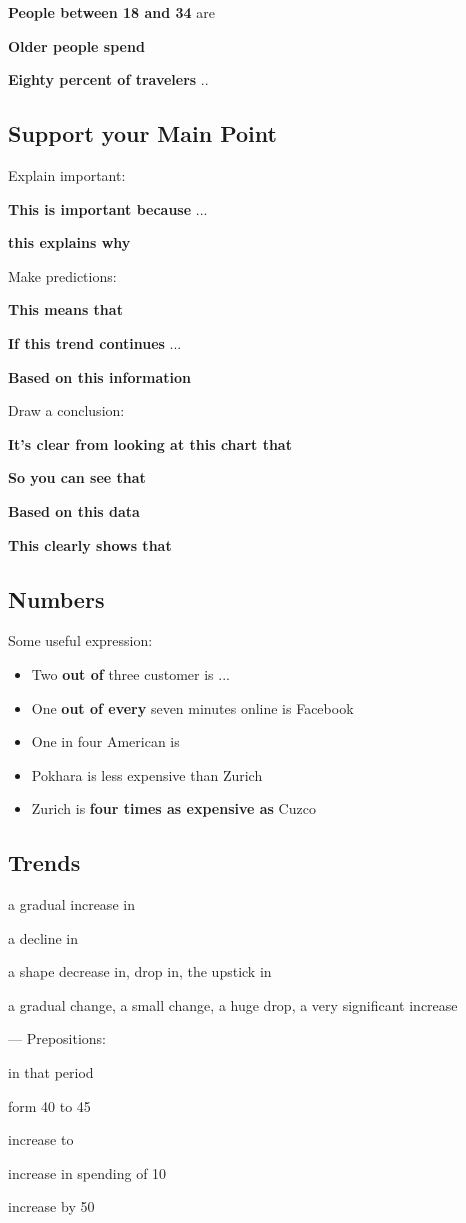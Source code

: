 \documentclass{article}
\begin{document}
\textbf{People between 18 and 34} are

\textbf{Older people spend}

\textbf{Eighty percent of travelers} ..

\subsection{Support your Main Point}
Explain important:

\textbf{This is important because} ...

\textbf{this explains why} 

Make predictions:

\textbf{This means that} 

\textbf{If this trend continues} ...

\textbf{Based on this information}

Draw a conclusion:

\textbf{It's clear from looking at this chart that}

\textbf{So you can see that}

\textbf{Based on this data}

\textbf{This clearly shows that}


\subsection{Numbers}

Some useful expression:

\begin{itemize}
	\item{Two \textbf{out of} three customer is ...}
	\item{One \textbf{out of every} seven minutes online is Facebook}
	\item{One in four American is }
	\item{Pokhara is less expensive than Zurich}
	\item{Zurich is \textbf{four times as expensive as} Cuzco} 
\end{itemize}

 \subsection{Trends}
 
 a gradual increase in
 
 a decline in
 
 a shape decrease in, drop in, the upstick in
 
 a gradual change, a small change, a huge drop, a very significant increase
 
 --- Prepositions:
 
 in that period
 
 form 40 to 45
 
 increase to 
 
 increase in spending  of 10
 
 increase by 50
 
 
 
 
\end{document}
